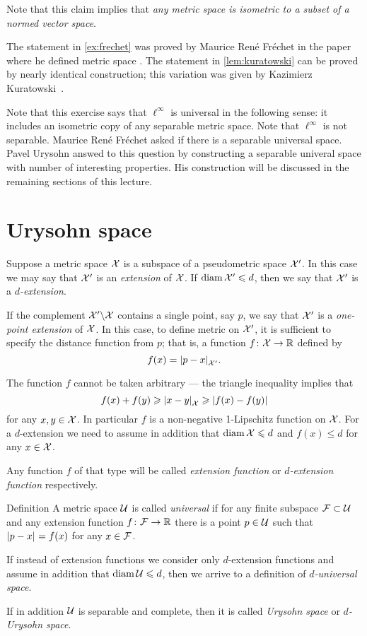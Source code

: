 Note that this claim implies that \emph{any metric space is isometric to a subset of a normed vector space}.

The statement in \ref{ex:frechet} was proved by Maurice René Fréchet in the paper where he defined metric space \cite{frechet}.
The statement in \ref{lem:kuratowski} can be proved by nearly identical construction;
this variation was given by Kazimierz Kuratowski~\cite{kuratowski}.

Note that this exercise says that $\ell^\infty$ is universal in the following sense: it includes an isometric copy of any separable metric space.
Note that $\ell^\infty$ is not separable.
Maurice René Fréchet asked if there is a separable universal space.
Pavel Urysohn answed to this question by constructing a separable univeral space with number of interesting properties.
His construction will be discussed in the remaining sections of this lecture.

\section{Urysohn space}
Suppose a metric space $\mathcal{X}$ is a subspace of a pseudometric space $\mathcal{X}'$.
In this case we may say that $\mathcal{X}'$ is an \emph{extension} of $\mathcal{X}$.
If $\operatorname{\rm diam}\nolimits\mathcal{X}'\leqslant d$, then we say that $\mathcal{X}'$ is a \emph{$d$-extension}.

If the complement $\mathcal{X}'\backslash \mathcal{X}$ contains a single point, say $p$, we say that $\mathcal{X}'$ is a \emph{one-point extension} of $\mathcal{X}$.
In this case, to define metric on $\mathcal{X}'$, it is sufficient to specify the distance function from $p$; that is, a function $f\colon\mathcal{X}\to\mathbb{R}$ defined by 
\[f(x)=\dist{p}{x}{\spc{X}'}.\]

The function $f$ cannot be taken arbitrary --- the triangle inequality implies that 
\[f(x)+f(y)\ge \dist{x}{y}{\spc{X}}\ge |f(x)-f(y)|\]
for any $x,y\in \mathcal{X}$.
In particular $f$ is a non-negative 1-Lipschitz function on $\mathcal{X}$.
For a $d$-extension we need to assume in addition that $\diam\spc{X}\z\le d$ and $f(x)\le d$ for any $x\in \mathcal{X}$.

Any function $f$ of that type will be called \emph{extension function}\label{page:extension function} or \emph{$d$-extension function} respectively.

\begin{thm}{Definition}\label{def:universal}
A metric space $\mathcal{U}$ is called \emph{universal}  if for any finite subspace $\mathcal{F}\subset\mathcal{U}$ and any extension function $f\colon\mathcal{F}\to\mathbb{R}$ there is a point $p\in \mathcal{U}$ such that $\dist{p}{x}{}=f(x)$ for any $x\in \mathcal{F}$.

If instead of extension functions we consider only $d$-extension functions and assume in addition that $\operatorname{\rm diam}\nolimits \mathcal{U}\leqslant d$, then we arrive to a definition of \emph{$d$-universal space}.

If in addition $\mathcal{U}$ is separable and complete, then it is called \emph{Urysohn space} or \emph{$d$-Urysohn space}.
\end{thm}


